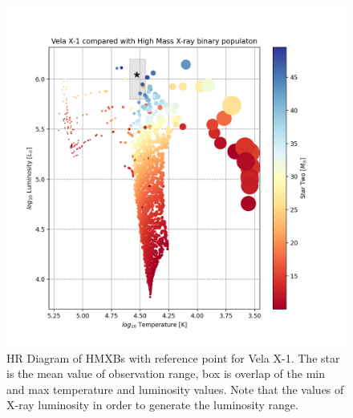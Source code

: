\documentclass[12pt, a4paper]{article}
\begin{document}
            \begin{figure}[H] 
                \centering
                \includegraphics[width=\textwidth]{figs/GeneratedFigs/VelaX-1/VelaX1HMXBPopulationHRComp.png}
                \caption{HR Diagram of HMXBs with reference point for Vela X-1. The star is the mean value of observation range, box is overlap of the min and max temperature and luminosity values. Note that the values of X-ray luminosity in order to generate the luminosity range. }
                \label{VelaX1HMXBPopulationHRComp}
            \end{figure}
    

    
\end{document}
